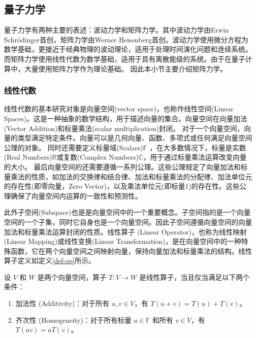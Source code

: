 \subsection{量子力学}
量子力学有两种主要的表述：波动力学和矩阵力学。其中波动力学由Erwin Schrödinger首创，矩阵力学由Werner Heisenberg首创。波动力学使用微分方程为数学基础，更接近于经典物理的波动理论，适用于处理时间演化问题和连续系统。
而矩阵力学使用线性代数为数学基础，适用于具有离散能级的系统。由于在量子计算中，大量使用矩阵力学作为理论基础。
因此本小节主要介绍矩阵力学。
\subsubsection*{线性代数}
线性代数的基本研究对象是向量空间(vector space)，也称作线性空间(Linear Spaces)。这是一种抽象的数学结构，用于描述向量的集合。向量空间在向量加法(Vector Addition)和标量乘法(scalar multiplication)封闭\cite{greub2012linear}。
对于一个向量空间，向量的类型满足特定条件。向量可以是几何向量、函数、多项式或任何满足向量空间公理的对象。
同时还需要定义标量域(Scalars)\(\mathbb{F}\) ，在大多数情况下，标量是实数(Real Numbers)\(\mathbb{R}\)或复数(Complex Numbers)\(\mathbb{C}\)，用于通过标量乘法运算改变向量的大小。
最后向量空间的还需要遵循一系列公理。这些公理规定了向量加法和标量乘法的性质，如加法的交换律和结合律、加法和标量乘法的分配律、加法单位元的存在性(即零向量，Zero Vector)，以及乘法单位元(即标量1)的存在性。这些公理确保了向量空间内运算的一致性和预测性。

此外子空间(Subspace)也是是向量空间中的一个重要概念。子空间指的是一个向量空间的一个子集，同时它自身也是一个向量空间。因此子空间遵循向量空间的向量加法和标量乘法运算封闭的性质。线性算子 (Linear Operator)，也称为线性映射(Linear Mapping)或线性变换(Linear Transformation)，是在向量空间中的一种特殊函数，它在两个向量空间之间映射向量，保持向量加法和标量乘法的结构。线性算子定义如定义\ref{def-op}所示。%
\begin{definition}\citep{greub2012linear}
    \label{def-op}
    设 \(V\) 和 \(W\) 是两个向量空间，算子 \(T: V \rightarrow W\) 是线性算子，当且仅当满足以下两个条件：
\begin{enumerate}
    \item 加法性 (Additivity)：对于所有 \(u, v \in V\)，有 \(T(u + v) = T(u) + T(v)\)。
    \item 齐次性 (Homogeneity)：对于所有标量 \(a \in \mathbb{F}\) 和所有 \(v \in V\)，有 \(T(av) = aT(v)\)。
\end{enumerate}
\end{definition}


